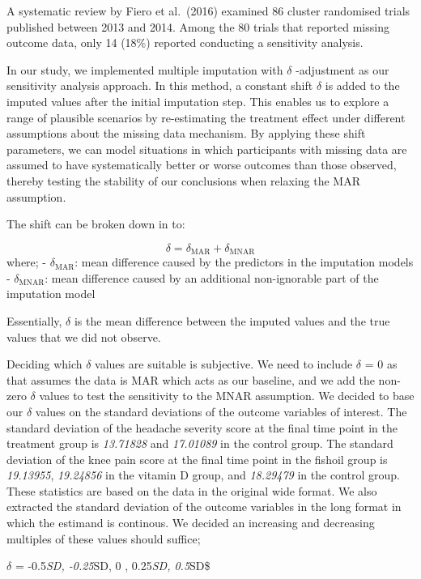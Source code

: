 \documentclass{article}
\begin{document}
A systematic review by Fiero et al.~(2016) examined 86 cluster
randomised trials published between 2013 and 2014. Among the 80 trials
that reported missing outcome data, only 14 (18\%) reported conducting a
sensitivity analysis.

In our study, we implemented multiple imputation with \(\delta\)
-adjustment as our sensitivity analysis approach. In this method, a
constant shift \(\delta\) is added to the imputed values after the
initial imputation step. This enables us to explore a range of plausible
scenarios by re-estimating the treatment effect under different
assumptions about the missing data mechanism. By applying these shift
parameters, we can model situations in which participants with missing
data are assumed to have systematically better or worse outcomes than
those observed, thereby testing the stability of our conclusions when
relaxing the MAR assumption.

The shift can be broken down in to:

\[\delta = \delta_\mathrm{MAR} + \delta_\mathrm{MNAR}\] where; -
\(\delta_\mathrm{MAR}\): mean difference caused by the predictors in the
imputation models - \(\delta_\mathrm{MNAR}\): mean difference caused by
an additional non-ignorable part of the imputation model

Essentially, \(\delta\) is the mean difference between the imputed
values and the true values that we did not observe.

Deciding which \(\delta\) values are suitable is subjective. We need to
include \(\delta\) = 0 as that assumes the data is MAR which acts as our
baseline, and we add the non-zero \(\delta\) values to test the
sensitivity to the MNAR assumption. We decided to base our \(\delta\)
values on the standard deviations of the outcome variables of interest.
The standard deviation of the headache severity score at the final time
point in the treatment group is \emph{13.71828} and \emph{17.01089} in
the control group. The standard deviation of the knee pain score at the
final time point in the fishoil group is \emph{19.13955},
\emph{19.24856} in the vitamin D group, and \emph{18.29479} in the
control group. These statistics are based on the data in the original
wide format. We also extracted the standard deviation of the outcome
variables in the long format in which the estimand is continous. We
decided an increasing and decreasing multiples of these values should
suffice;

\(\delta\) = -0.5\emph{SD, -0.25}SD, 0 , 0.25\emph{SD, 0.5}SD\$
\end{document}
